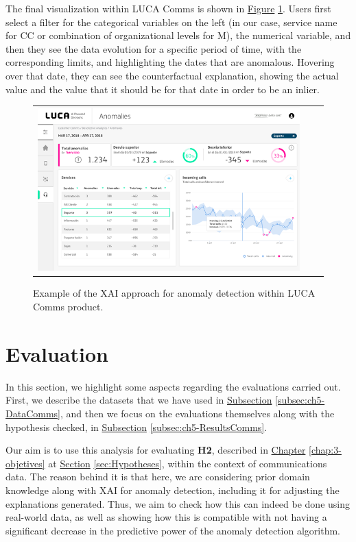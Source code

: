 The final visualization within LUCA Comms is shown in \hyperref[fig:ch5-comms-anomalies-result]{Figure} \ref{fig:ch5-comms-anomalies-result}. Users first select a filter for the categorical variables on the left (in our case, service name for CC or combination of organizational levels for M), the numerical variable, and then they see the data evolution for a specific period of time, with the corresponding limits, and highlighting the dates that are anomalous. Hovering over that date, they can see the counterfactual explanation, showing the actual value and the value that it should be for that date in order to be an inlier.

\begin{figure}[h!]
\centering
  \begin{tabular}{c@{\qquad}c@{\qquad}c}
\includegraphics[width=0.9\columnwidth]{figures/chapter5_LucaComms/CommsAnomalies.png}
  \end{tabular} 
  \caption{Example of the XAI approach for anomaly detection within LUCA Comms product. \label{fig:ch5-comms-anomalies-result}}
\end{figure}

\section{Evaluation}\label{sec:ch5-evaluation}
In this section, we highlight some aspects regarding the evaluations carried out. First, we describe the datasets that we have used in \hyperref[subsec:ch5-DataComms]{Subsection} \ref{subsec:ch5-DataComms}, and then we focus on the evaluations themselves along with the hypothesis checked, in \hyperref[subsec:ch5-ResultsComms]{Subsection} \ref{subsec:ch5-ResultsComms}.

Our aim is to use this analysis for evaluating \textbf{H2}, described in \hyperref[chap:3-objetives]{Chapter} \ref{chap:3-objetives} at
\hyperref[sec:Hypotheses]{Section} \ref{sec:Hypotheses}, within the context of communications data. The reason behind it is that here, we are considering prior domain knowledge along with XAI for anomaly detection, including it for adjusting the explanations generated. Thus, we aim to check how this can indeed be done using real-world data, as well as showing how this is compatible with not having a significant decrease in the predictive power of the anomaly detection algorithm.

